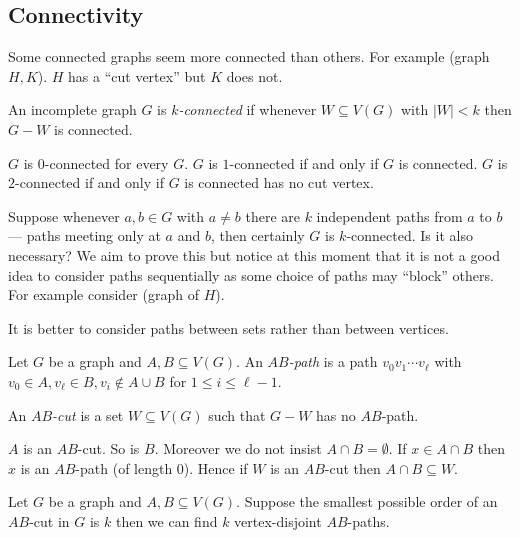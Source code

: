 \documentclass[a4paper]{article}
\begin{document}
\subsection{Connectivity}

Some connected graphs seem more connected than others. For example (graph \(H, K\)). \(H\) has a ``cut vertex'' but \(K\) does not.

\begin{definition}
  An incomplete graph \(G\) is \emph{\(k\)-connected} if whenever \(W \subseteq V(G)\) with \(|W| < k\) then \(G - W\) is connected. %
\end{definition}

\begin{eg}
  \(G\) is \(0\)-connected for every \(G\). \(G\) is \(1\)-connected if and only if \(G\) is connected. \(G\) is \(2\)-connected if and only if \(G\) is connected has no cut vertex.
\end{eg}

Suppose whenever \(a, b \in G\) with \(a \neq b\) there are \(k\) independent paths from \(a\) to \(b\) --- paths meeting only at \(a\) and \(b\), then certainly \(G\) is \(k\)-connected. Is it also necessary? We aim to prove this but notice at this moment that it is not a good idea to consider paths sequentially as some choice of paths may ``block'' others. For example consider (graph of \(H\)).

It is better to consider paths between sets rather than between vertices.

\begin{definition}[cut]
  Let \(G\) be a graph and \(A, B \subseteq V(G)\). An \emph{\(AB\)-path} is a path \(v_0v_1 \cdots v_\ell\) with \(v_0 \in A, v_\ell \in B, v_i \notin A \cup B\) for \(1 \leq i \leq \ell - 1\).

  An \emph{\(AB\)-cut} is a set \(W \subseteq V(G)\) such that \(G - W\) has no \(AB\)-path.
\end{definition}

\begin{remark}
  \(A\) is an \(AB\)-cut. So is \(B\). Moreover we do not insist \(A \cap B = \emptyset\). If \(x \in A \cap B\) then \(x\) is an \(AB\)-path (of length \(0\)). Hence if \(W\) is an \(AB\)-cut then \(A \cap B \subseteq W\).
\end{remark}

\begin{lemma}
  Let \(G\) be a graph and \(A, B \subseteq V(G)\). Suppose the smallest possible order of an \(AB\)-cut in \(G\) is \(k\) then we can find \(k\) vertex-disjoint \(AB\)-paths.
\end{lemma}
\end{document}
